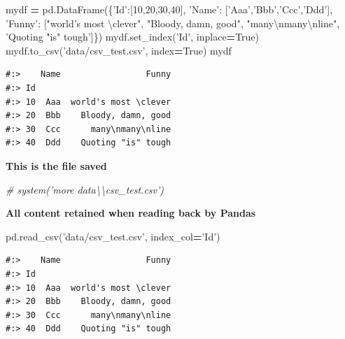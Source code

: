 \documentclass[
]{book}
\newenvironment{Shaded}{\begin{snugshade}}{\end{snugshade}}
\newcommand{\CharTok}[1]{\textcolor[rgb]{0.5,0.5,0.5}{#1}}
\newcommand{\CommentTok}[1]{\textcolor[rgb]{0.37,0.37,0.37}{\textit{#1}}}
\newcommand{\DecValTok}[1]{\textcolor[rgb]{0.06,0.06,0.06}{#1}}
\newcommand{\NormalTok}[1]{#1}
\newcommand{\OperatorTok}[1]{\textcolor[rgb]{0.43,0.43,0.43}{\textbf{#1}}}
\newcommand{\StringTok}[1]{\textcolor[rgb]{0.5,0.5,0.5}{#1}}
\newcommand{\VariableTok}[1]{\textcolor[rgb]{0,0,0}{#1}}
\begin{document}
\begin{Shaded}
\begin{Highlighting}[]
\NormalTok{mydf }\OperatorTok{=}\NormalTok{ pd.DataFrame(\{}\StringTok{'Id'}\NormalTok{:[}\DecValTok{10}\NormalTok{,}\DecValTok{20}\NormalTok{,}\DecValTok{30}\NormalTok{,}\DecValTok{40}\NormalTok{], }
                     \StringTok{'Name'}\NormalTok{:  [}\StringTok{'Aaa'}\NormalTok{,}\StringTok{'Bbb'}\NormalTok{,}\StringTok{'Ccc'}\NormalTok{,}\StringTok{'Ddd'}\NormalTok{],}
                     \StringTok{'Funny'}\NormalTok{: [}\StringTok{"world's most \textbackslash{}clever"}\NormalTok{, }
                     \StringTok{"Bloody, damn, good"}\NormalTok{, }
                     \StringTok{"many}\CharTok{\textbackslash{}n}\StringTok{many}\CharTok{\textbackslash{}n}\StringTok{line"}\NormalTok{, }
                     \StringTok{'Quoting "is" tough'}\NormalTok{]\})}
\NormalTok{mydf.set_index(}\StringTok{'Id'}\NormalTok{, inplace}\OperatorTok{=}\VariableTok{True}\NormalTok{)}
\NormalTok{mydf.to_csv(}\StringTok{'data/csv_test.csv'}\NormalTok{, index}\OperatorTok{=}\VariableTok{True}\NormalTok{)}
\NormalTok{mydf}
\end{Highlighting}
\end{Shaded}

\begin{verbatim}
#:>    Name                 Funny
#:> Id                           
#:> 10  Aaa  world's most \clever
#:> 20  Bbb    Bloody, damn, good
#:> 30  Ccc      many\nmany\nline
#:> 40  Ddd    Quoting "is" tough
\end{verbatim}

\textbf{This is the file saved}

\begin{Shaded}
\begin{Highlighting}[]
\CommentTok{# system('more data\textbackslash{}\textbackslash{}csv_test.csv')}
\end{Highlighting}
\end{Shaded}

\textbf{All content retained when reading back by Pandas}

\begin{Shaded}
\begin{Highlighting}[]
\NormalTok{pd.read_csv(}\StringTok{'data/csv_test.csv'}\NormalTok{, index_col}\OperatorTok{=}\StringTok{'Id'}\NormalTok{)}
\end{Highlighting}
\end{Shaded}

\begin{verbatim}
#:>    Name                 Funny
#:> Id                           
#:> 10  Aaa  world's most \clever
#:> 20  Bbb    Bloody, damn, good
#:> 30  Ccc      many\nmany\nline
#:> 40  Ddd    Quoting "is" tough
\end{verbatim}
\end{document}
